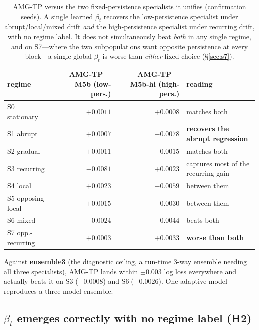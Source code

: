 \documentclass[11pt]{article}
\begin{document}
\begin{table}[H]
\centering
\small
\begin{tabular}{@{}lrrl@{}}
\toprule
regime & AMG-TP $-$ M5b (low-pers.) & AMG-TP $-$ M5b-hi (high-pers.) & reading \\
\midrule
S0 stationary      & $+0.0011$ & $+0.0008$ & matches both \\
S1 abrupt          & $+0.0007$ & $\mathbf{-0.0078}$ & \textbf{recovers the abrupt regression} \\
S2 gradual         & $+0.0011$ & $-0.0015$ & matches both \\
S3 recurring       & $\mathbf{-0.0081}$ & $+0.0023$ & captures most of the recurring gain \\
S4 local           & $+0.0023$ & $-0.0059$ & between them \\
S5 opposing-local  & $+0.0015$ & $-0.0030$ & between them \\
S6 mixed           & $-0.0024$ & $-0.0044$ & beats both \\
S7 opp.-recurring  & $+0.0003$ & $\mathbf{+0.0033}$ & \textbf{worse than both} \\
\bottomrule
\end{tabular}
\caption{AMG-TP versus the two fixed-persistence specialists it unifies
(confirmation seeds). A single learned $\beta_t$ recovers the low-persistence
specialist under abrupt/local/mixed drift \emph{and} the high-persistence
specialist under recurring drift, with no regime label. It does not
simultaneously beat \emph{both} in any single regime, and on S7---where the two
subpopulations want opposite persistence at every block---a single global
$\beta_t$ is worse than \emph{either} fixed choice (\S\ref{sec:s7}).}
\label{tab:specialists}
\end{table}

\noindent Against \textbf{ensemble3} (the diagnostic ceiling, a run-time 3-way
ensemble needing all three specialists), AMG-TP lands within $\pm0.003$ log loss
everywhere and actually beats it on S3 ($-0.0008$) and S6 ($-0.0026$). One
adaptive model reproduces a three-model ensemble.

\subsection{$\beta_t$ emerges correctly with no regime label (H2)}
\end{document}
